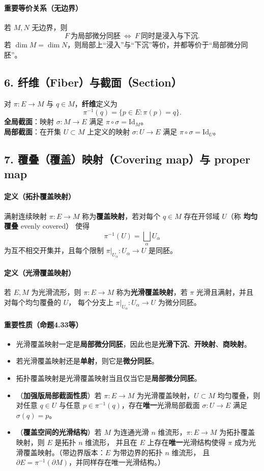 \documentclass[12pt]{article}
\begin{document}
\paragraph{重要等价关系（无边界）}
若 $M,N$ 无边界，则
\[
F\ \text{为局部微分同胚}\ \Longleftrightarrow\ F\ \text{同时是浸入与下沉}.
\]
若 $\dim M=\dim N$，则局部上“浸入”与“下沉”等价，并都等价于“局部微分同胚”。

\subsection*{6. 纤维（Fiber）与截面（Section）}
对 $\pi:E\to M$ 与 $q\in M$，\textbf{纤维}定义为
\[
\pi^{-1}(q)=\{p\in E:\pi(p)=q\}.
\]
\textbf{全局截面}：映射 $\sigma:M\to E$ 满足 $\pi\circ\sigma=\mathrm{Id}_M$。\\
\textbf{局部截面}：在开集 $U\subset M$ 上定义的映射 $\sigma:U\to E$ 满足 $\pi\circ\sigma=\mathrm{Id}_U$。

\subsection*{7. 覆叠（覆盖）映射（Covering map）与 proper map}
\paragraph{定义（拓扑覆盖映射）}
满射连续映射 $\pi:E\to M$ 称为\textbf{覆盖映射}，若对每个 $q\in M$ 存在开邻域 $U$（称 \textbf{均匀覆叠} evenly covered）
使得
\[
\pi^{-1}(U)=\bigsqcup_{\alpha} U_\alpha
\]
为互不相交开集并，且每个限制 $\pi|_{U_\alpha}:U_\alpha\to U$ 是同胚。

\paragraph{定义（光滑覆盖映射）}
若 $E,M$ 为光滑流形，则 $\pi:E\to M$ 称为\textbf{光滑覆盖映射}，若 $\pi$ 光滑且满射，并且对每个均匀覆叠的 $U$，
每个分支上 $\pi|_{U_\alpha}:U_\alpha\to U$ 为微分同胚。

\paragraph{重要性质（命题4.33等）}
\begin{itemize}
\item 光滑覆盖映射一定是\textbf{局部微分同胚}，因此也是\textbf{光滑下沉}、\textbf{开映射}、\textbf{商映射}。
\item 若光滑覆盖映射还是\textbf{单射}，则它是\textbf{微分同胚}。
\item 拓扑覆盖映射是光滑覆盖映射当且仅当它是\textbf{局部微分同胚}。
\item （\textbf{加强版局部截面性质}）若 $\pi:E\to M$ 为光滑覆盖映射，$U\subset M$ 均匀覆叠，则对任意 $q\in U$ 与任意
$p\in\pi^{-1}(q)$，存在\textbf{唯一}光滑局部截面 $\sigma:U\to E$ 满足 $\sigma(q)=p$。
\item （\textbf{覆盖空间的光滑结构}）若 $M$ 为连通光滑 $n$ 维流形，$\pi:E\to M$ 为拓扑覆盖映射，则 $E$ 是拓扑 $n$ 维流形，
并且在 $E$ 上存在\textbf{唯一}光滑结构使得 $\pi$ 成为光滑覆盖映射。（带边界版本：$E$ 为带边界的拓扑 $n$ 维流形，
且 $\partial E=\pi^{-1}(\partial M)$，并同样存在唯一光滑结构。）
\end{itemize}
\end{document}
